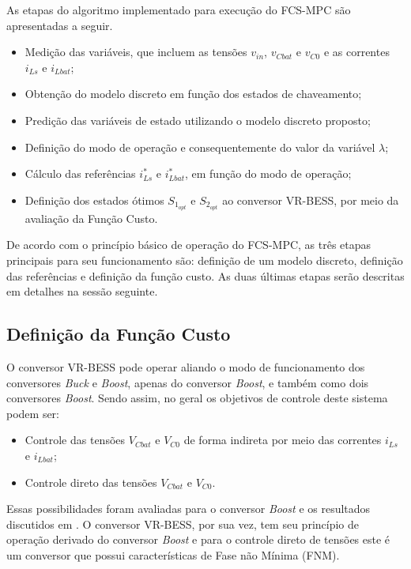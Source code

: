 As etapas do algoritmo implementado para execução do FCS-MPC são apresentadas a seguir. 

\begin{itemize}
    \item Medição das variáveis, que incluem as tensões $v_{in}$, $v_{Cbat}$ e $v_{C0}$ e as correntes $i_{Ls}$ e $i_{Lbat}$;
    \item Obtenção do modelo discreto em função dos estados de chaveamento; 
    \item Predição das variáveis de estado utilizando o modelo discreto proposto; 
    \item Definição do modo de operação e consequentemente do valor da variável $\lambda$;
    \item Cálculo das referências $i_{Ls}^*$ e $i_{Lbat}^*$, em função do modo de operação;
    \item Definição dos estados ótimos $S_{1_{opt}}$ e $S_{2_{opt}}$ ao conversor VR-BESS, por meio da avaliação da Função Custo. 
\end{itemize}



De acordo com o princípio básico de operação do FCS-MPC, as três etapas principais para seu funcionamento são: definição de um modelo discreto, definição das referências e definição da função custo. As duas últimas etapas serão descritas em detalhes na sessão seguinte.

\subsection{Definição da Função Custo}

O conversor VR-BESS pode operar aliando o modo de funcionamento dos conversores \textit{Buck} e \textit{Boost}, apenas do conversor \textit{Boost}, e também como dois conversores \textit{Boost}. Sendo assim, no geral os objetivos de controle deste sistema podem ser: 

\begin{itemize}
    \item Controle das tensões $V_{Cbat}$ e $V_{C0}$ de forma indireta por meio das correntes $i_{Ls}$ e $i_{Lbat}$;
    \item Controle direto das tensões $V_{Cbat}$ e $V_{C0}$.
\end{itemize}

Essas possibilidades foram avaliadas para o conversor \textit{Boost} e os resultados discutidos em \cite{braga2022controle}. O conversor VR-BESS, por sua vez, tem seu princípio de operação derivado do conversor \textit{Boost} e para o controle direto de tensões este é um conversor que possui características de Fase não Mínima (FNM). 

